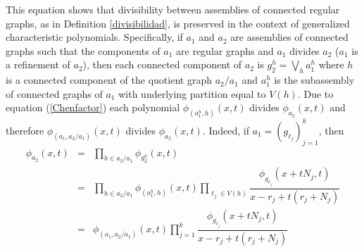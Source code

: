 \documentclass[11pt]{article}
\theoremstyle{definition}
\begin{document}
This equation shows that divisibility between assemblies of connected regular graphs, as in Definition \ref{divisibilidad}, is preserved in the context of generalized characteristic polynomials. Specifically, if $a_1$ and $a_2$ are assemblies of connected graphs such that the components of $a_1$ are regular graphs and $a_1$ divides $a_2$ ($a_1$ is a refinement of $a_2$), then each connected component of $a_2$ is $g^h_2=\displaystyle{\bigvee_{h} a^h_1}$ where $h$ is a connected component of the quotient graph $a_2/a_1$ and $a^h_1$ is the subassembly of connected graphs of $a_1$ with underlying partition equal to $V(h)$. Due to equation (\ref{Chenfactor}) each polynomial $\phi_{(a^h_1,h)}(x, t)$ divides $\phi_{a_2}(x,t)$ and therefore $\phi_{(a_1, a_2/a_1)}(x,t)$ divides $\phi_{a_2}(x,t)$.
Indeed, if $a_1=(g_{\ell_j})^k_{j=1}$, then
\begin{eqnarray*}
    \phi_{a_2}(x, t)&=&\prod_{h\in a_2/a_1} \phi_{g^h_2}(x,t)\\
    &=&\prod_{h\in a_2/a_1} \phi_{(a^h_1, h)}(x,t)\prod_{\ell_j\in V(h)}\dfrac{\phi_{g_{\ell_j}}(x+tN_j,t)}{x-r_j+t(r_j+N_j)}\\
    &=&\phi_{(a_1, a_2/a_1)}(x,t)\prod^k_{j=1}\dfrac{\phi_{g_{\ell_j}}(x+tN_j,t)}{x-r_j+t(r_j+N_j)}
\end{eqnarray*}
\end{document}
